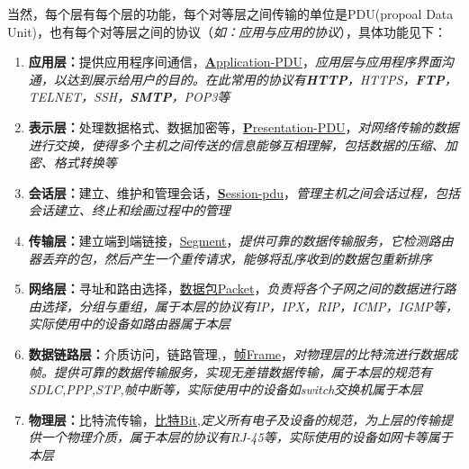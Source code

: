 \documentclass[UTF8,a4paper,8pt]{ctexbook}
\begin{document}
			当然，每个层有每个层的功能，每个对等层之间传输的单位是PDU(propoal  Data Unit)，也有每个对等层之间的协议（\textit{如：应用与应用的协议}），具体功能见下：
			\begin{enumerate}
				\item \textbf{应用层：}提供应用程序间通信，\underline{\textbf{A}pplication-PDU}，\textit{应用层与应用程序界面沟通，以达到展示给用户的目的。在此常用的协议有\textbf{HTTP}，HTTPS，\textbf{FTP}，TELNET，SSH，\textbf{SMTP}，POP3等}
				\item \textbf{表示层：}处理数据格式、数据加密等，\underline{\textbf{P}resentation-PDU}，\textit{对网络传输的数据进行交换，使得多个主机之间传送的信息能够互相理解，包括数据的压缩、加密、格式转换等}
				\item \textbf{会话层：}建立、维护和管理会话，\underline{\textbf{S}ession-pdu}，\textit{管理主机之间会话过程，包括会话建立、终止和绘画过程中的管理}
				\item \textbf{传输层：}建立端到端链接，\underline{Segment}，\textit{提供可靠的数据传输服务，它检测路由器丢弃的包，然后产生一个重传请求，能够将乱序收到的数据包重新排序}
				\item \textbf{网络层：}寻址和路由选择，\underline{数据包Packet}，\textit{负责将各个子网之间的数据进行路由选择，分组与重组，属于本层的协议有IP，IPX，RIP，ICMP，IGMP等，实际使用中的设备如路由器属于本层}
				\item \textbf{数据链路层：}介质访问，链路管理,，\underline{帧Frame}，\textit{对物理层的比特流进行数据成帧。提供可靠的数据传输服务，实现无差错数据传输，属于本层的规范有SDLC,PPP,STP,帧中断等，实际使用中的设备如switch交换机属于本层}
				\item \textbf{物理层：}比特流传输，\underline{比特Bit},\textit{定义所有电子及设备的规范，为上层的传输提供一个物理介质，属于本层的协议有RJ-45等，实际使用的设备如网卡等属于本层}
			\end{enumerate}	
			
\end{document}
